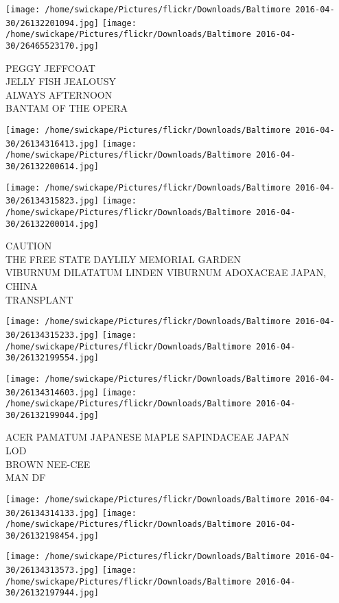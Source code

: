 \documentclass[10pt,letterpaper]{article}
\begin{document}
\texttt{[image: /home/swickape/Pictures/flickr/Downloads/Baltimore 2016-04-30/26132201094.jpg]}
\texttt{[image: /home/swickape/Pictures/flickr/Downloads/Baltimore 2016-04-30/26465523170.jpg]}

PEGGY JEFFCOAT\\
JELLY FISH JEALOUSY\\
ALWAYS AFTERNOON\\
BANTAM OF THE OPERA
\pagebreak

\texttt{[image: /home/swickape/Pictures/flickr/Downloads/Baltimore 2016-04-30/26134316413.jpg]}
\texttt{[image: /home/swickape/Pictures/flickr/Downloads/Baltimore 2016-04-30/26132200614.jpg]}

\texttt{[image: /home/swickape/Pictures/flickr/Downloads/Baltimore 2016-04-30/26134315823.jpg]}
\texttt{[image: /home/swickape/Pictures/flickr/Downloads/Baltimore 2016-04-30/26132200014.jpg]}

CAUTION\\
THE FREE STATE DAYLILY MEMORIAL GARDEN\\
VIBURNUM DILATATUM LINDEN VIBURNUM ADOXACEAE JAPAN, CHINA\\
TRANSPLANT
\pagebreak

\texttt{[image: /home/swickape/Pictures/flickr/Downloads/Baltimore 2016-04-30/26134315233.jpg]}
\texttt{[image: /home/swickape/Pictures/flickr/Downloads/Baltimore 2016-04-30/26132199554.jpg]}

\texttt{[image: /home/swickape/Pictures/flickr/Downloads/Baltimore 2016-04-30/26134314603.jpg]}
\texttt{[image: /home/swickape/Pictures/flickr/Downloads/Baltimore 2016-04-30/26132199044.jpg]}

ACER PAMATUM JAPANESE MAPLE SAPINDACEAE JAPAN\\
LOD\\
BROWN NEE{-}CEE\\
MAN DF
\pagebreak

\texttt{[image: /home/swickape/Pictures/flickr/Downloads/Baltimore 2016-04-30/26134314133.jpg]}
\texttt{[image: /home/swickape/Pictures/flickr/Downloads/Baltimore 2016-04-30/26132198454.jpg]}

\texttt{[image: /home/swickape/Pictures/flickr/Downloads/Baltimore 2016-04-30/26134313573.jpg]}
\texttt{[image: /home/swickape/Pictures/flickr/Downloads/Baltimore 2016-04-30/26132197944.jpg]}
\end{document}
